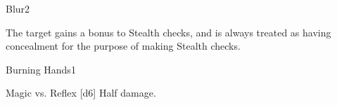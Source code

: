 \begin{spellsection}{Blur}{2}
\begin{spellheader}
\end{spellheader}
\begin{spellcontent}
    \begin{spelltargetinginfo}
    \end{spelltargetinginfo}
    \begin{spelleffects}
        \spelleffect The target gains a  bonus to Stealth checks, and is always treated as having concealment for the purpose of making Stealth checks.
        \spelldur \durpersonallong
    \end{spelleffects}
\end{spellcontent}
\begin{spellfooter}
\end{spellfooter}
\end{spellsection}

\begin{spellsection}{Burning Hands}{1}
\begin{spellheader}
\end{spellheader}
\begin{spellcontent}
    \begin{spelltargetinginfo}
    \end{spelltargetinginfo}
    \begin{spelleffects}
        \begin{spellattack}{Magic vs. Reflex}
            \spellsuccess {}[d6]
            \spellfailure Half damage.
        \end{spellattack}
    \end{spelleffects}
\end{spellcontent}
\begin{spellfooter}
\end{spellfooter}

\begin{comment}
\subsubsection{C}
\end{comment}
\end{spellsection}

